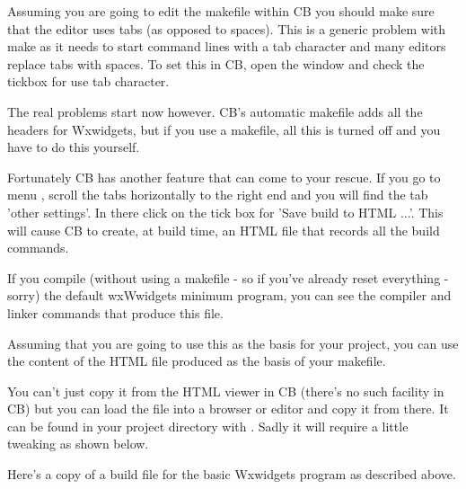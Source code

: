 Assuming you are going to edit the makefile within CB you should make sure that the editor uses tabs (as opposed to spaces). This is a generic problem with make as it needs to start command lines with a tab character and many editors replace tabs with spaces. To set this in CB, open the  window and check the tickbox for use tab character.

The real problems start now however. CB's automatic makefile adds all the headers for Wxwidgets, but if you use a makefile, all this is turned off and you have to do this yourself.

Fortunately CB has another feature that can come to your rescue. If you go to menu , scroll the tabs horizontally to the right end and you will find the tab 'other settings'. In there click on the tick box for 'Save build to HTML ...'. This will cause CB to create, at build time, an HTML file that records all the build commands.


If you compile (without using a makefile - so if you've already reset everything - sorry) the default wxWwidgets minimum program, you can see the compiler and linker commands that produce this file.

Assuming that you are going to use this as the basis for your project, you can use the content of the HTML file produced as the basis of your makefile.

You can't just copy it from the HTML viewer in CB (there's no such facility in CB) but you can load the file into a browser or editor and copy it from there. It can be found in your project directory with . Sadly it will require a little tweaking as shown below.

Here's a copy of a build file for the basic Wxwidgets program as described above.



